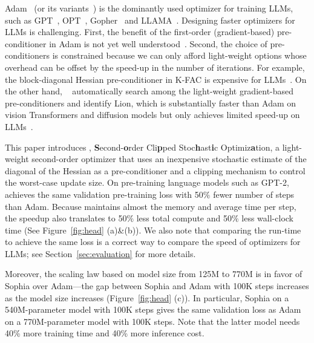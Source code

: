 Adam~\citep{kingma2014Adam} (or its variants~\citep{loshchilov2017decoupled,shazeer2018adafactor,you2019large}) is the dominantly used optimizer for training LLMs, such as GPT~\citep{radford2019language,brown2020language}, OPT~\citep{zhang2022opt}, Gopher~\citep{rae2021scaling} and LLAMA~\citep{touvron2023llama}. 
Designing faster optimizers for LLMs is challenging. First, the benefit of the first-order (gradient-based) pre-conditioner in Adam is not yet well understood~\citep{ liu2020understanding,zhang2020adaptive,kunstner2023noise}. Second, the choice of pre-conditioners is constrained because we can only afford light-weight options whose overhead can be offset by the speed-up in the number of iterations. For example, the block-diagonal Hessian pre-conditioner in K-FAC is  expensive for LLMs~\citep{martens2015optimizing,grosse2016kronecker, ba2017distributed,martens2018kronecker}. On the other hand, ~\citet{chen2023symbolic} automatically search among the light-weight gradient-based pre-conditioners and identify Lion, which is substantially faster than Adam on vision Transformers and diffusion models but only achieves limited speed-up on LLMs~\citep{chen2023symbolic}. 
 

This paper introduces \ours, \textbf{S}econd-\textbf{o}rder Cli\textbf{p}ped Stoc\textbf{h}ast\textbf{i}c Optimiz\textbf{a}tion, a light-weight second-order optimizer that uses an inexpensive stochastic estimate of the diagonal of the Hessian as a pre-conditioner and a clipping mechanism to control the worst-case update size. On pre-training language models such as GPT-2, {\ours} achieves the same validation pre-training loss with 50$\%$ fewer number of steps than Adam. Because {\ours} maintains almost the memory and average time per step, the speedup also translates to 50$\%$ less total compute and 50$\%$ less wall-clock time (See Figure~\ref{fig:head} (a)\&(b)). We also note that comparing the run-time to achieve the same loss is a correct way to compare the speed of optimizers for LLMs; see Section~\ref{sec:evaluation} for more details. 




Moreover, the scaling law based on model size from 125M to 770M is in favor of Sophia over Adam---the gap between Sophia and Adam with 100K steps increases as the model size increases (Figure~\ref{fig:head} (c)). 
In particular, Sophia on a 540M-parameter model with 100K steps gives the same validation loss as  Adam on a 770M-parameter model with 100K steps. Note that the latter model needs 40\% more training time and 40\% more inference cost.  

